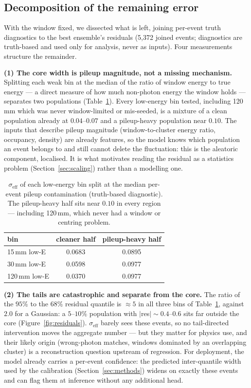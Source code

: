 \documentclass[11pt,a4paper]{article}
\newcommand{\seff}{\ensuremath{\sigma_{\mathrm{eff}}}}
\begin{document}
\subsection{Decomposition of the remaining error}
\label{sec:anatomy}

With the window fixed, we dissected what is left, joining per-event truth
diagnostics to the best ensemble's residuals (5{,}372 joined events;
diagnostics are truth-based and used only for analysis, never as inputs).
Four measurements structure the remainder.

\textbf{(1) The core width is pileup magnitude, not a missing mechanism.}
Splitting each weak bin at the median of the ratio of window energy to true
energy --- a direct measure of how much non-photon energy the window holds
--- separates two populations (Table~\ref{tab:anatomy}). Every low-energy
bin tested, including 120\,mm which was never window-limited or mis-seeded,
is a mixture of a clean population already at $0.04$--$0.07$ and a
pileup-heavy population near $0.10$. The inputs that describe pileup
magnitude (window-to-cluster energy ratio, occupancy, density) are already
features, so the model knows which population an event belongs to and still
cannot delete the fluctuation: this is the aleatoric component, localised.
It is what motivates reading the residual as a statistics problem
(Section~\ref{sec:scaling}) rather than a modelling one.

\begin{table}[h]
\centering
\caption{\seff{} of each low-energy bin split at the median per-event pileup
contamination (truth-based diagnostic). The pileup-heavy half sits near
$0.10$ in every region --- including 120\,mm, which never had a window or
centring problem.}
\label{tab:anatomy}
\begin{tabular}{lcc}
\toprule
bin & cleaner half & pileup-heavy half\\
\midrule
15\,mm low-E & 0.0683 & 0.0895\\
30\,mm low-E & 0.0598 & 0.0977\\
120\,mm low-E & 0.0370 & 0.0977\\
\bottomrule
\end{tabular}
\end{table}

\textbf{(2) The tails are catastrophic and separate from the core.} The
ratio of the $95\%$ to the $68\%$ residual quantile is $\approx 5$ in all
three bins of Table~\ref{tab:anatomy}, against $2.0$ for a Gaussian: a
$5$--$10\%$ population with $|$res$| \sim 0.4$--$0.6$ sits far outside the
core (Figure~\ref{fig:residuals}). \seff{} barely sees these events, so no
tail-directed intervention moves the aggregate number --- but they matter
for physics use, and their likely origin (wrong-photon matches, windows
dominated by an overlapping cluster) is a reconstruction question upstream
of regression. For deployment, the model already carries a per-event
confidence: the predicted inter-quantile width used by the calibration
(Section~\ref{sec:methods}) widens on exactly these events and can flag
them at inference without any additional head.
\end{document}
